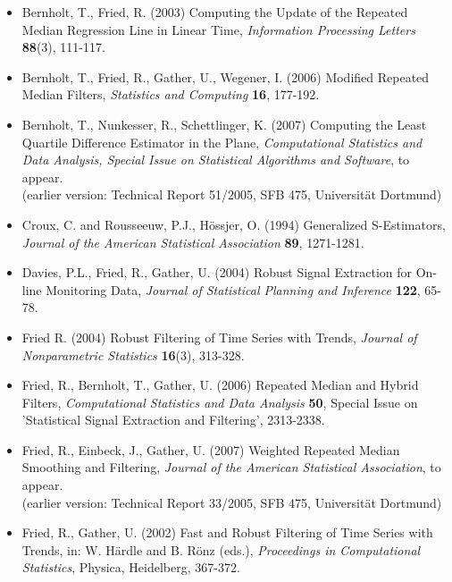 \documentclass[a4paper]{scrartcl}
\begin{document}
\renewcommand{\labelitemi}{ }
\begin{itemize}
\item
Bernholt, T., Fried, R. (2003) Computing the Update of the Repeated
Median Regression Line in Linear Time, \emph{Information Processing
Letters} \textbf{88}(3), 111-117.

\item
Bernholt, T., Fried, R., Gather, U., Wegener, I. (2006) Modified
Repeated Median Filters, \emph{Statistics and Computing} \textbf{16}, 177-192.

\item
Bernholt, T., Nunkesser, R., Schettlinger, K. (2007) Computing
the Least Quartile Difference Estimator in the Plane,
\emph{Computational Statistics and Data Analysis, Special Issue on
Statistical Algorithms and Software}, to appear.\\
(earlier version:
Technical Report 51/2005, SFB 475, Universit\"{a}t Dortmund)

\item
Croux, C. and Rousseeuw, P.J., H\"{o}ssjer, O.
(1994) Generalized S-Estimators, \emph{Journal of the American Statistical
Association}
\textbf{89}, 1271-1281.

\item
Davies, P.L., Fried, R., Gather, U. (2004) Robust Signal Extraction
for On-line Monitoring Data, \emph{Journal of Statistical Planning
and Inference} \textbf{122}, 65-78.

\item
Fried R. (2004) Robust Filtering of Time Series with Trends, \emph{Journal
of Nonparametric Statistics} \textbf{16}(3), 313-328.

\item
Fried, R., Bernholt, T., Gather, U. (2006) Repeated Median and
Hybrid Filters, \emph{Computational Statistics and Data Analysis} \textbf{50},
Special Issue on 'Statistical Signal Extraction and Filtering',
2313-2338.

\item
Fried, R., Einbeck, J., Gather, U. (2007) Weighted Repeated Median
Smoothing and Filtering, \emph{Journal of the American Statistical
Association}, to appear.\\
(earlier version:
Technical Report 33/2005, SFB 475, Universit\"{a}t Dortmund)

\item
Fried, R., Gather, U. (2002) Fast and Robust Filtering of Time Series
with Trends, in: W. H\"{a}rdle and B. R\"{o}nz (eds.),
\emph{Proceedings in Computational Statistics}, Physica, Heidelberg, 367-372.


\end{itemize}
\end{document}
